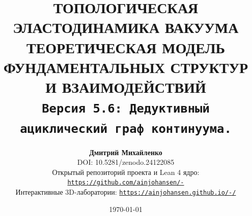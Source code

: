\documentclass[11pt,a4paper]{article}
\theoremstyle{definition}
\theoremstyle{remark}
\begin{document}
	
\title{\textbf{\Large ТОПОЛОГИЧЕСКАЯ ЭЛАСТОДИНАМИКА ВАКУУМА}\\
\large ТЕОРЕТИЧЕСКАЯ МОДЕЛЬ\\ ФУНДАМЕНТАЛЬНЫХ СТРУКТУР И ВЗАИМОДЕЙСТВИЙ\\[2mm]
\small \texttt{Версия 5.6: Дедуктивный ациклический граф континуума.}}

\author{\textbf{Дмитрий Михайленко}\\[1mm]
\small DOI: 10.5281/zenodo.24122085\\
\small Открытый репозиторий проекта и Lean 4 ядро: \href{https://github.com/ainjohansen/-}{\texttt{https://github.com/ainjohansen/-}}\\[0.5mm]
\small Интерактивные 3D-лаборатории: \href{https://ainjohansen.github.io/-/}{\texttt{https://ainjohansen.github.io/-/}}}

\date{\today}

\maketitle
\end{document}
